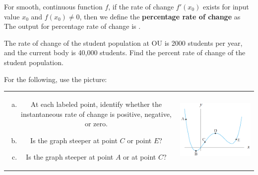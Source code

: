 \documentclass[notes]{subfiles}
\begin{document}
		\begin{defn}
			For smooth, continuous function $f$, if the rate of change $f'(x_0)$ exists for input value $x_0$ and $f(x_0)\neq 0$, then we define the \textbf{percentage rate of change} as 
		The output for percentage rate of change is .
		\end{defn}
			\vspace{.1in}
			
		\begin{ex} 
			The rate of change of the student population at OU is 2000 students per year, and the current body is 40,000 students.  Find the percent rate of change of the student population.		
		\end{ex}
			
		\begin{ex}
			For the following, use the picture:\\
			\begin{tabular}{cl}
				\begin{minipage}{.45\textwidth}
				\begin{enumerate}[(a)]
					\item At each labeled point, identify whether the instantaneous rate of change is positive, negative, or zero.
					\item Is the graph steeper at point $C$ or point $E$?
					\item Is the graph steeper at point $A$ or at point $C$?
				\end{enumerate}
				\end{minipage}
				&
				\begin{minipage}{.4\textwidth}
					\includegraphics{./img/sec22-1.png}
				\end{minipage}
			\end{tabular}
		\end{ex}
			\newpage
			
\end{document}
